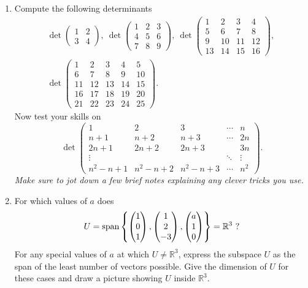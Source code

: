 \begin{enumerate}
\item
Compute the following determinants
\begin{gather*}
\det\begin{pmatrix}1&2\\3&4
\end{pmatrix},\:
\det\begin{pmatrix}1&2&3\\4&5&6\\7&8&9
\end{pmatrix},\:
\det\begin{pmatrix}1&2&3&4\\5&6&7&8\\9&10&11&12\\13&14&15&16
\end{pmatrix} ,\:\\
\det\begin{pmatrix}1&2&3&4&5\\6&7&8&9&10\\11&12&13&14&15\\
16&17&18&19&20\\21&22&23&24&25
\end{pmatrix}.
\end{gather*}
Now test your skills on
\[
\det\left(\begin{array}{ccccc}1&2&3&\cdots&n\\n+1&n+2&n+3&\cdots&2n\\2n+1&2n+2&2n+3&&3n \\
\vdots&&&\ddots&\vdots\\n^2-n+1&n^2-n+2&n^2-n+3&\cdots&n^2
\end{array}\right).
\]
{\itshape Make sure to jot down a few brief notes explaining any clever tricks you use.}

\item
For which values of $a$ does \[U=\operatorname{span}\left\{
\begin{pmatrix}1\\0\\1\end{pmatrix},\begin{pmatrix}1\\2\\-3\end{pmatrix},\begin{pmatrix}a\\1\\0\end{pmatrix}\right\}={\mathbb R}^3\ ?\]
 For any special values of $a$ at which $U\neq{\mathbb R}^3$, express the subspace $U$ as the span of the least number of vectors possible. Give the dimension of $U$ for these cases and
 draw a picture showing $U$ inside ${\mathbb R}^3$.


\end{enumerate}
